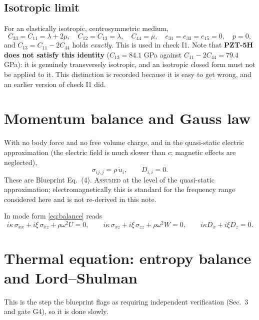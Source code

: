 \documentclass[11pt]{article}
\newcommand{\s}{\sigma}
\theoremstyle{plain}
\begin{document}
\subsection{Isotropic limit}
\label{sec:isotropic}

For an elastically isotropic, centrosymmetric medium,
\begin{equation}
  C_{33}=C_{11}=\lambda+2\mu,\quad C_{12}=C_{13}=\lambda,\quad C_{44}=\mu,
  \quad e_{31}=e_{33}=e_{15}=0,\quad p=0,
  \label{eq:isotropic-limits}
\end{equation}
and $C_{13}=C_{11}-2C_{44}$ holds \emph{exactly}. This is used in check I1.
Note that \textbf{PZT-5H does not satisfy this identity} ($C_{13}=84.1$ GPa
against $C_{11}-2C_{44}=79.4$ GPa): it is genuinely transversely isotropic, and an
isotropic closed form must not be applied to it. This distinction is recorded
because it is easy to get wrong, and an earlier version of check I1 did.

\section{Momentum balance and Gauss law}
\label{sec:balance}

With no body force and no free volume charge, and in the quasi-static electric
approximation (the electric field is much slower than $c$; magnetic effects are
neglected),
\begin{equation}
  \s_{ij,j} = \rho\,\ddot u_i, \qquad D_{i,i} = 0 .
  \label{eq:balance}
\end{equation}
These are Blueprint Eq.~(4). \textsc{Assumed} at the level of the quasi-static
approximation; electromagnetically this is standard for the frequency range
considered here and is not re-derived in this note.

In mode form \eqref{eq:balance} reads
\begin{equation}
  i\kappa\,\s_{xx} + i\xi\,\s_{xz} + \rho\omega^2 U = 0, \qquad
  i\kappa\,\s_{xz} + i\xi\,\s_{zz} + \rho\omega^2 W = 0, \qquad
  i\kappa D_x + i\xi D_z = 0 .
  \label{eq:balance-mode}
\end{equation}

\section{Thermal equation: entropy balance and Lord--Shulman}
\label{sec:ls}

This is the step the blueprint flags as requiring independent verification
(Sec.~3 and gate G4), so it is done slowly.
\end{document}
